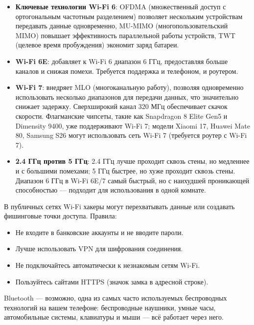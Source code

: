 \begin{itemize}
  \item \textbf{Ключевые технологии Wi-Fi 6}: OFDMA (множественный доступ с ортогональным частотным разделением) позволяет нескольким устройствам передавать данные одновременно, MU-MIMO (многопользовательский MIMO) повышает эффективность параллельной работы устройств, TWT (целевое время пробуждения) экономит заряд батареи.
  \item \textbf{Wi-Fi 6E}: добавляет к Wi-Fi 6 диапазон 6 ГГц, предоставляя больше каналов и снижая помехи. Требуется поддержка и телефоном, и роутером.
  \item \textbf{Wi-Fi 7}: внедряет MLO (многоканальную работу), позволяя одновременно использовать несколько диапазонов для передачи данных, что значительно снижает задержку. Сверхширокий канал 320 МГц обеспечивает скачок скорости. Флагманские чипсеты, такие как Snapdragon 8 Elite Gen5 и Dimensity 9400, уже поддерживают Wi-Fi 7; модели Xiaomi 17, Huawei Mate 80, Samsung S26 могут использовать сеть Wi-Fi 7 (требуется роутер с Wi-Fi 7).
  \item \textbf{2.4 ГГц против 5 ГГц}: 2.4 ГГц лучше проходит сквозь стены, но медленнее и с большими помехами; 5 ГГц быстрее, но хуже проходит сквозь стены. Диапазон 6 ГГц в Wi-Fi 6E/7 самый быстрый, но с наихудшей проникающей способностью — подходит для использования в одной комнате.
\end{itemize}


В публичных сетях Wi-Fi хакеры могут перехватывать данные или создавать фишинговые точки доступа. Правила:

\begin{itemize}
  \item Не входите в банковские аккаунты и не вводите пароли.
  \item Лучше использовать VPN для шифрования соединения.
  \item Не подключайтесь автоматически к незнакомым сетям Wi-Fi.
  \item Пользуйтесь сайтами HTTPS (значок замка в адресной строке).
\end{itemize}


Bluetooth — возможно, одна из самых часто используемых беспроводных технологий на вашем телефоне: беспроводные наушники, умные часы, автомобильные системы, клавиатуры и мыши — всё работает через него.

